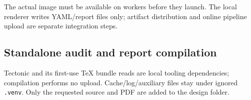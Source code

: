 \documentclass[11pt,a4paper]{article}
\newcommand{\file}[1]{\nolinkurl{#1}}
\begin{document}
The actual image must be available on workers before they launch. The local
renderer writes YAML/report files only; artifact distribution and online pipeline
upload are separate integration steps.

\subsection{Standalone audit and report compilation}


Tectonic and its first-use TeX bundle reads are local tooling dependencies;
compilation performs no upload. Cache/log/auxiliary files stay under ignored
\file{.venv}. Only the requested source and PDF are added to the design folder.
\end{document}
